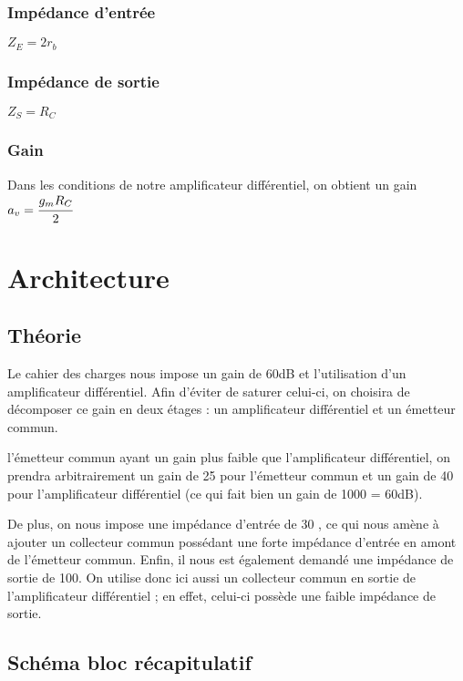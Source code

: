 \documentclass[11pt;a4paper]{report}
\begin{document}
   \subsection{Impédance d'entrée}
    $Z_E = 2 r_b$

   \subsection{Impédance de sortie}
    $Z_S = R_C$

   \subsection{Gain}
    Dans les conditions de notre amplificateur différentiel, on obtient un gain 
    $a_v = \cfrac{g_m R_C}{2}$


 \chapter{Architecture}
  \section{Théorie}

    Le cahier des charges nous impose un gain de 60dB et l'utilisation d'un amplificateur différentiel.
    Afin d'éviter de saturer celui-ci, on choisira de décomposer ce gain en deux étages : un amplificateur différentiel et un émetteur commun.

    l'émetteur commun ayant un gain plus faible que l'amplificateur différentiel, on prendra arbitrairement un gain de 25 pour l'émetteur commun et un gain de 40 pour l'amplificateur différentiel (ce qui fait bien un gain de 1000 = 60dB).

    De plus, on nous impose une impédance d'entrée de 30 \kilo\ohm, ce qui nous amène à ajouter un collecteur commun possédant une forte impédance d'entrée en amont de l'émetteur commun.
    Enfin, il nous est également demandé une impédance de sortie de 100\ohm. On utilise donc ici aussi un collecteur commun en sortie de l'amplificateur différentiel ; en effet, celui-ci possède une faible impédance de sortie.


  \section{Schéma bloc récapitulatif}

\end{document}
